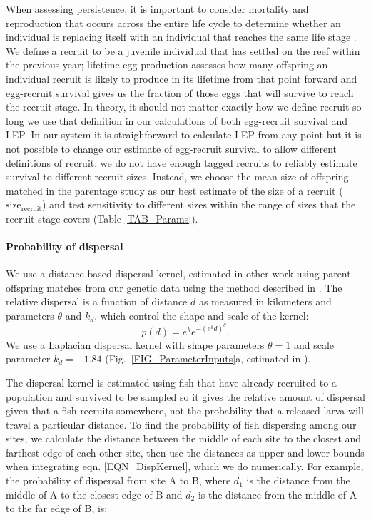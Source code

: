 \documentclass[12pt, oneside]{article}   	%
\begin{document}
When assessing persistence, it is important to consider mortality and reproduction that occurs across the entire life cycle to determine whether an individual is replacing itself with an individual that reaches the same life stage \citep{burgess2014beyond}. We define a recruit to be a juvenile individual that has settled on the reef within the previous year; lifetime egg production assesses how many offspring an individual recruit is likely to produce in its lifetime from that point forward and egg-recruit survival gives us the fraction of those eggs that will survive to reach the recruit stage. In theory, it should not matter exactly how we define recruit so long we use that definition in our calculations of both egg-recruit survival and LEP. In our system it is straighforward to calculate LEP from any point but it is not possible to change our estimate of egg-recruit survival to allow different definitions of recruit: we do not have enough tagged recruits to reliably estimate survival to different recruit sizes. Instead, we choose the mean size of offspring matched in the parentage study as our best estimate of the size of a recruit ($\text{size}_\text{recruit}$) and test sensitivity to different sizes within the range of sizes that the recruit stage covers (Table \ref{TAB_Params}).

\paragraph*{Probability of dispersal}

We use a distance-based dispersal kernel, estimated in other work using parent-offspring matches from our genetic data \citep{catalanoInPrepconnectivity} using the method described in \cite{bode2018estimating}. The relative dispersal is a function of distance $d$ as measured in kilometers and parameters $\theta$ and $k_d$, which control the shape and scale of the kernel:
\begin{equation}
p(d) = e^k e^{-(e^k d)^\theta}. \label{EQN_DispKernel}
\end{equation}
We use a Laplacian dispersal kernel with shape parameters $\theta = 1$ and scale parameter $k_d = -1.84$ (Fig.\ \ref{FIG_ParameterInputs}a, estimated in \citep{catalanoInPrepconnectivity}).

The dispersal kernel is estimated using fish that have already recruited to a population and survived to be sampled so it gives the relative amount of dispersal given that a fish recruits somewhere, not the probability that a released larva will travel a particular distance. To find the probability of fish dispersing among our sites, we calculate the distance between the middle of each site to the closest and farthest edge of each other site, then use the distances as upper and lower bounds when integrating eqn. \ref{EQN_DispKernel}, which we do numerically. For example, the probability of dispersal from site A to B, where $d_1$ is the distance from the middle of A to the closest edge of B and $d_2$ is the distance from the middle of A to the far edge of B, is:
\end{document}
